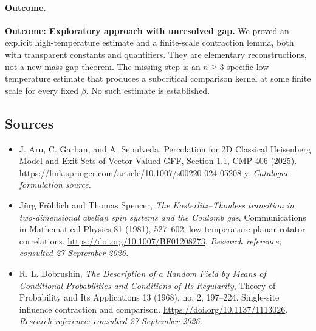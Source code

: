 \documentclass[11pt,a4paper]{article}
\numberwithin{equation}{section}
\begin{document}
\paragraph{Outcome.}
\textbf{Outcome: Exploratory approach with unresolved gap.}
We proved an explicit high-temperature estimate and a finite-scale contraction lemma, both with transparent constants and quantifiers. They are elementary reconstructions, not a new mass-gap theorem. The missing step is an $n\ge3$-specific low-temperature estimate that produces a subcritical comparison kernel at some finite scale for every fixed $\beta$. No such estimate is established.

\subsection{Sources}
\begin{itemize}\raggedright
\item[\textnormal{[S1]}]\hypertarget{source:statement:1}{} J. Aru, C. Garban, and A. Sepulveda, Percolation for 2D Classical Heisenberg Model and Exit Sets of Vector Valued GFF, Section 1.1, CMP 406 (2025).
\url{https://link.springer.com/article/10.1007/s00220-024-05208-y}.
{\small\textit{Catalogue formulation source.}}
\item[\textnormal{[E1]}]\hypertarget{extra:statement:1}{} J\"urg Fr\"ohlich and Thomas Spencer, \emph{The Kosterlitz--Thouless transition in two-dimensional abelian spin systems and the Coulomb gas}, Communications in Mathematical Physics 81 (1981), 527--602; low-temperature planar rotator correlations.
\url{https://doi.org/10.1007/BF01208273}.
{\small\textit{Research reference; consulted 27 September 2026.}}
\item[\textnormal{[E2]}]\hypertarget{extra:statement:2}{} R. L. Dobrushin, \emph{The Description of a Random Field by Means of Conditional Probabilities and Conditions of Its Regularity}, Theory of Probability and Its Applications 13 (1968), no. 2, 197--224. Single-site influence contraction and comparison.
\url{https://doi.org/10.1137/1113026}.
{\small\textit{Research reference; consulted 27 September 2026.}}
\end{itemize}
\end{document}
